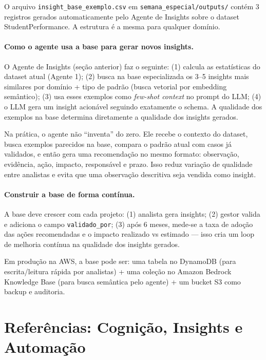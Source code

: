 O arquivo \texttt{insight\_base\_exemplo.csv} em \texttt{semana\_especial/outputs/} contém 3 registros gerados automaticamente pelo Agente de Insights sobre o dataset StudentPerformance. A estrutura é a mesma para qualquer domínio.

\paragraph{Como o agente usa a base para gerar novos insights.}
O Agente de Insights (seção anterior) faz o seguinte: (1) calcula as estatísticas do dataset atual (Agente 1); (2) busca na base especializada os 3--5 insights mais similares por domínio + tipo de padrão (busca vetorial por embedding semântico); (3) usa esses exemplos como \textit{few-shot context} no prompt do LLM; (4) o LLM gera um insight acionável seguindo exatamente o schema. A qualidade dos exemplos na base determina diretamente a qualidade dos insights gerados.

\begin{BoardBox}[title=Uso da Base pelo Agente]
Na prática, o agente não ``inventa'' do zero. Ele recebe o contexto do dataset, busca exemplos parecidos na base, compara o padrão atual com casos já validados, e então gera uma recomendação no mesmo formato: observação, evidência, ação, impacto, responsável e prazo. Isso reduz variação de qualidade entre analistas e evita que uma observação descritiva seja vendida como insight.
\end{BoardBox}

\paragraph{Construir a base de forma contínua.}
A base deve crescer com cada projeto: (1) analista gera insights; (2) gestor valida e adiciona o campo \texttt{validado\_por}; (3) após 6 meses, mede-se a taxa de adoção das ações recomendadas e o impacto realizado vs estimado --- isso cria um loop de melhoria contínua na qualidade dos insights gerados.

Em produção na AWS, a base pode ser: uma tabela no DynamoDB (para escrita/leitura rápida por analistas) + uma coleção no Amazon Bedrock Knowledge Base (para busca semântica pelo agente) + um bucket S3 como backup e auditoria.

\section*{Referências: Cognição, Insights e Automação}

